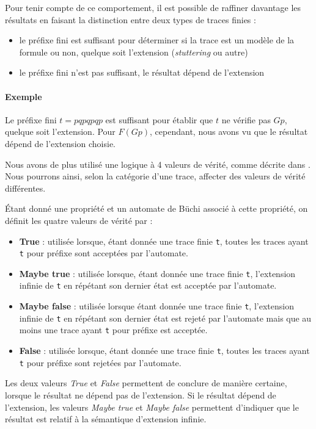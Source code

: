 Pour tenir compte de ce comportement, il est possible de raffiner davantage les
résultats en faisant la distinction entre deux types de traces finies :

\begin{itemize}
\item
  le préfixe fini est suffisant pour déterminer si la trace est un
  modèle de la formule ou non, quelque soit l'extension
  (\emph{stuttering} ou autre)
\item
  le préfixe fini n'est pas suffisant, le résultat dépend de l'extension
\end{itemize}

\paragraph{Exemple}
Le préfixe fini \(t = pqpqpqp\) est suffisant pour établir que \(t\) ne vérifie
pas \(G p\), quelque soit l'extension. Pour \(F (G p)\), cependant, nous avons
vu que le résultat dépend de l'extension choisie.

Nous avons de plus utilisé une logique à 4 valeurs de vérité, comme
décrite dans \cite{morse_ltl}. Nous pourrons ainsi, selon la catégorie d'une
trace, affecter des valeurs de vérité différentes.

Étant donné une propriété et un automate de Büchi associé à cette propriété, on
définit les quatre valeurs de vérité par :

\begin{itemize}
\item
  \textbf{True} : utilisée lorsque, étant donnée une trace finie \texttt{t},
  toutes les traces ayant \texttt{t} pour préfixe sont acceptées par
  l'automate.
\item
  \textbf{Maybe true} : utilisée lorsque, étant donnée une trace finie
  \texttt{t}, l'extension infinie de \texttt{t} en répétant son
  dernier état est acceptée par l'automate.
\item
  \textbf{Maybe false} : utilisée lorsque étant donnée une trace finie
  \texttt{t}, l'extension infinie de \texttt{t} en répétant son
  dernier état est rejeté par l'automate mais que au moins une trace
  ayant \texttt{t} pour préfixe est acceptée.
\item
  \textbf{False} : utilisée lorsque, étant donnée une trace finie \texttt{t},
  toutes les traces ayant \texttt{t} pour préfixe sont rejetées par
  l'automate.
\end{itemize}

Les deux valeurs \emph{True} et \emph{False} permettent de conclure de manière
certaine, lorsque le résultat ne dépend pas de l'extension. Si le résultat
dépend de l'extension, les valeurs \emph{Maybe true} et \emph{Maybe false}
permettent d'indiquer que le résultat est relatif à la sémantique d'extension
infinie.


